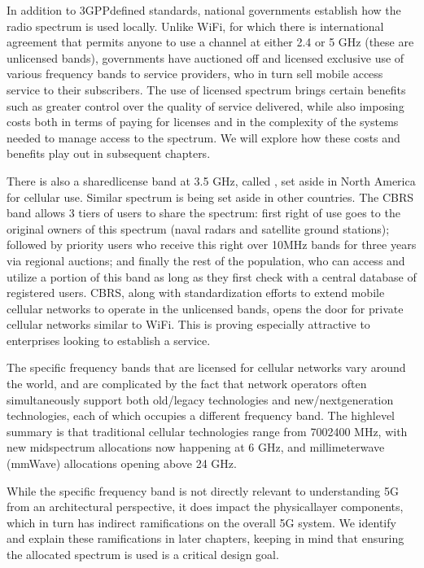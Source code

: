 \documentclass[a4paper,11pt,english]{sphinxmanual}
\begin{document}
\sphinxAtStartPar
In addition to 3GPP\sphinxhyphen{}defined standards, national governments establish
how the radio spectrum is used locally. Unlike Wi\sphinxhyphen{}Fi, for which there
is international agreement that permits anyone to use a channel at
either 2.4 or 5 GHz (these are unlicensed bands), governments have
auctioned off and licensed exclusive use of various frequency bands to
service providers, who in turn sell mobile access service to their
subscribers. The use of licensed spectrum brings certain benefits such
as greater control over the quality of service delivered, while also
imposing costs both in terms of paying for licenses and in the
complexity of the systems needed to manage access to the spectrum. We
will explore how these costs and benefits play out in subsequent
chapters.

\sphinxAtStartPar
There is also a shared\sphinxhyphen{}license band at 3.5 GHz, called , set aside in North America for
cellular use. Similar spectrum is being set aside in other countries.
The CBRS band allows 3 tiers of users to share the spectrum: first
right of use goes to the original owners of this spectrum (naval
radars and satellite ground stations); followed by priority users who
receive this right over 10MHz bands for three years via regional
auctions; and finally the rest of the population, who can access and
utilize a portion of this band as long as they first check with a
central database of registered users. CBRS, along with
standardization efforts to extend mobile cellular networks to operate
in the unlicensed bands, opens the door for private cellular networks
similar to Wi\sphinxhyphen{}Fi. This is proving especially attractive to enterprises
looking to establish a  service.

\sphinxAtStartPar
The specific frequency bands that are licensed for cellular networks
vary around the world, and are complicated by the fact that network
operators often simultaneously support both old/legacy technologies and
new/next\sphinxhyphen{}generation technologies, each of which occupies a different
frequency band. The high\sphinxhyphen{}level summary is that traditional cellular
technologies range from 700\sphinxhyphen{}2400 MHz, with new mid\sphinxhyphen{}spectrum
allocations now happening at 6 GHz, and millimeter\sphinxhyphen{}wave (mmWave)
allocations opening above 24 GHz.

\sphinxAtStartPar
While the specific frequency band is not directly relevant to
understanding 5G from an architectural perspective, it does impact the
physical\sphinxhyphen{}layer components, which in turn has indirect ramifications on
the overall 5G system. We identify and explain these ramifications in
later chapters, keeping in mind that ensuring the allocated spectrum
is used  is a critical design goal.
\end{document}
